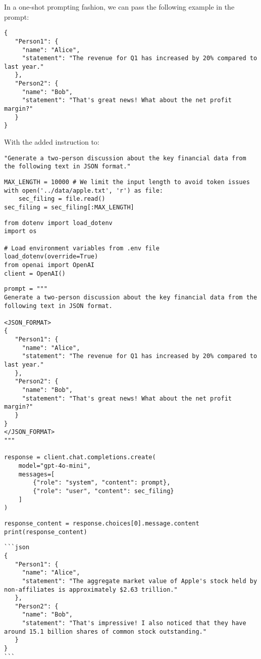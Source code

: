 In a one-shot prompting fashion, we can pass the following example in the prompt:
\begin{verbatim}
{
   "Person1": {
     "name": "Alice", 
     "statement": "The revenue for Q1 has increased by 20% compared to last year."
   },
   "Person2": {
     "name": "Bob",
     "statement": "That's great news! What about the net profit margin?"
   }
}
\end{verbatim}
With the added instruction to:

\begin{verbatim}
"Generate a two-person discussion about the key financial data from the following text in JSON format."
\end{verbatim}

\begin{verbatim}
MAX_LENGTH = 10000 # We limit the input length to avoid token issues 
with open('../data/apple.txt', 'r') as file:
    sec_filing = file.read()
sec_filing = sec_filing[:MAX_LENGTH] 
\end{verbatim}

\begin{verbatim}
from dotenv import load_dotenv
import os

# Load environment variables from .env file
load_dotenv(override=True)
from openai import OpenAI
client = OpenAI()
\end{verbatim}

\begin{verbatim}
prompt = """
Generate a two-person discussion about the key financial data from the following text in JSON format.

<JSON_FORMAT>
{
   "Person1": {
     "name": "Alice", 
     "statement": "The revenue for Q1 has increased by 20% compared to last year."
   },
   "Person2": {
     "name": "Bob",
     "statement": "That's great news! What about the net profit margin?"
   }
}
</JSON_FORMAT>
"""

response = client.chat.completions.create(
    model="gpt-4o-mini",
    messages=[
        {"role": "system", "content": prompt},
        {"role": "user", "content": sec_filing}
    ]
)
\end{verbatim}

\begin{verbatim}
response_content = response.choices[0].message.content
print(response_content)
\end{verbatim}

\begin{verbatim}
```json
{
   "Person1": {
     "name": "Alice", 
     "statement": "The aggregate market value of Apple's stock held by non-affiliates is approximately $2.63 trillion."
   },
   "Person2": {
     "name": "Bob",
     "statement": "That's impressive! I also noticed that they have around 15.1 billion shares of common stock outstanding."
   }
}
```
\end{verbatim}

